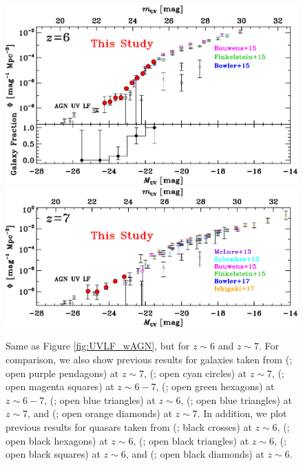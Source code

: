 \documentclass[]{pasj01}
\begin{document}
\begin{figure}
 \begin{center}
  \includegraphics[width=16cm]{LF_z6_ave.eps} 
  \includegraphics[width=16cm]{LF_z7_ave.eps} 
 \end{center}
\caption{
Same as Figure \ref{fig:UVLF_wAGN}, but for $z \sim 6$ and $z \sim 7$. 
For comparison, 
we also show previous results for galaxies taken from  
 (; open purple pendagons) at $z \sim 7$, 
 (; open cyan circles) at $z \sim 7$, 
 (; open magenta squares) at $z \sim 6-7$, 
 (; open green hexagons) at $z \sim 6-7$, 
 (; open blue triangles) at $z \sim 6$, 
 (; open blue triangles) at $z \sim 7$, 
and 
 (; open orange diamonds) at $z \sim 7$. 
In addition, 
we plot previous results for quasars taken from 
 (; black crosses) at $z \sim 6$, 
 (; open black hexagons) at $z \sim 6$, 
 (; open black triangles) at $z \sim 6$,  
 (; open black squares) at $z \sim 6$, 
and 
 (; open black diamonds) at $z \sim 6$. 
}\label{fig:UVLF_wAGN2}
\end{figure}
\end{document}
